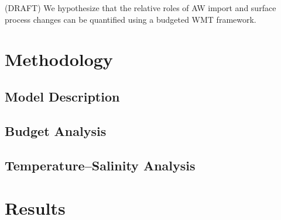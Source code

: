 \documentclass[draft]{agujournal2019}
\begin{document}
(DRAFT) We hypothesize that the relative roles of AW import and surface process changes can be quantified using a budgeted WMT framework.


\section{Methodology}\label{methods}

\subsection{Model Description}

\subsection{Budget Analysis}





\subsection{Temperature--Salinity Analysis}


\section{Results}




\end{document}
